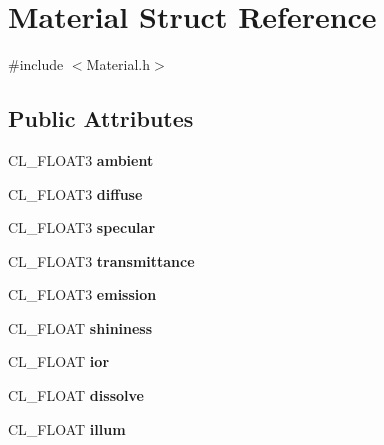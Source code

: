 \hypertarget{struct_material}{}\section{Material Struct Reference}
\label{struct_material}


{\ttfamily \#include $<$Material.\+h$>$}

\subsection*{Public Attributes}
\begin{DoxyCompactItemize}
\item 
C\+L\+\_\+\+F\+L\+O\+A\+T3 {\bfseries ambient}\hypertarget{struct_material_a752c15ce1c7b70928bdfb70463393b92}{}\label{struct_material_a752c15ce1c7b70928bdfb70463393b92}

\item 
C\+L\+\_\+\+F\+L\+O\+A\+T3 {\bfseries diffuse}\hypertarget{struct_material_ab9a4bcacdfddb29b4fe3076077e58e58}{}\label{struct_material_ab9a4bcacdfddb29b4fe3076077e58e58}

\item 
C\+L\+\_\+\+F\+L\+O\+A\+T3 {\bfseries specular}\hypertarget{struct_material_aae5e3367aebdc370f57360e14ad02ff7}{}\label{struct_material_aae5e3367aebdc370f57360e14ad02ff7}

\item 
C\+L\+\_\+\+F\+L\+O\+A\+T3 {\bfseries transmittance}\hypertarget{struct_material_aa911dac1218c7b9be77a3e2dff7f8fa4}{}\label{struct_material_aa911dac1218c7b9be77a3e2dff7f8fa4}

\item 
C\+L\+\_\+\+F\+L\+O\+A\+T3 {\bfseries emission}\hypertarget{struct_material_ab35f6e0a2286dc0ce2a003b6dbc475e5}{}\label{struct_material_ab35f6e0a2286dc0ce2a003b6dbc475e5}

\item 
C\+L\+\_\+\+F\+L\+O\+AT {\bfseries shininess}\hypertarget{struct_material_a9b2957a1acfa8618f4281d011b793499}{}\label{struct_material_a9b2957a1acfa8618f4281d011b793499}

\item 
C\+L\+\_\+\+F\+L\+O\+AT {\bfseries ior}\hypertarget{struct_material_a285eead3d684534d814a035183a12bc0}{}\label{struct_material_a285eead3d684534d814a035183a12bc0}

\item 
C\+L\+\_\+\+F\+L\+O\+AT {\bfseries dissolve}\hypertarget{struct_material_ae3af1c65ddacef527ab57b1bde8b385b}{}\label{struct_material_ae3af1c65ddacef527ab57b1bde8b385b}

\item 
C\+L\+\_\+\+F\+L\+O\+AT {\bfseries illum}\hypertarget{struct_material_ae1234ae2cd2ebd791a8c31cda49f067b}{}\label{struct_material_ae1234ae2cd2ebd791a8c31cda49f067b}

\end{DoxyCompactItemize}


